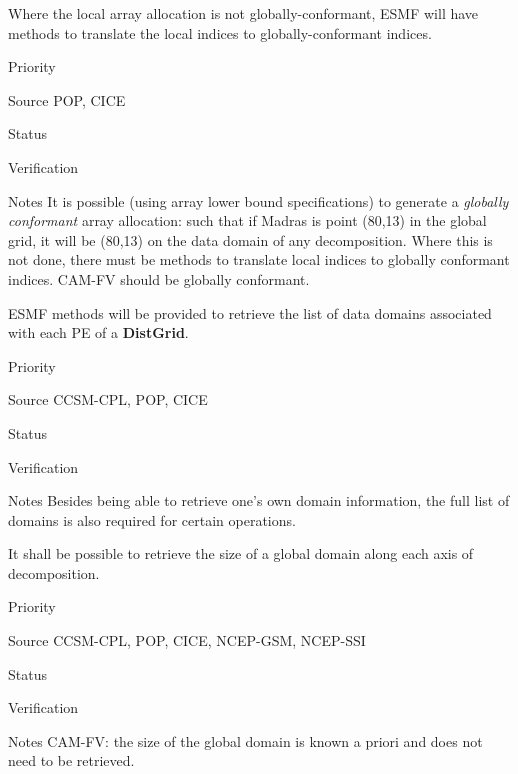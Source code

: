 
Where the local array allocation is not globally-conformant, 
ESMF will have methods to translate the local indices to
globally-conformant indices.

\begin{reqlist}
\item[Priority]
\item[Source] POP, CICE 
\item[Status]
\item[Verification]
\item[Notes] It is possible (using array lower bound specifications)
  to generate a \emph{globally conformant} array allocation: such that
  if Madras is point (80,13) in the global grid, it will be (80,13) on
  the data domain of any decomposition. Where this is not done, there
  must be methods to translate local indices to globally conformant
  indices.  CAM-FV should be globally conformant.
\end{reqlist}


ESMF methods will be provided to retrieve the list of data
domains associated with each PE of a  \textbf{DistGrid}.

\begin{reqlist}
\item[Priority]
\item[Source] CCSM-CPL, POP, CICE
\item[Status]
\item[Verification]
\item[Notes] Besides being able to retrieve one's own domain
  information, the full list of domains is also required for certain
  operations.
\end{reqlist}



It shall be possible to retrieve the size of a global domain
along each axis of decomposition.

\begin{reqlist}
\item[Priority]
\item[Source] CCSM-CPL, POP, CICE, NCEP-GSM, NCEP-SSI
\item[Status]
\item[Verification]
\item[Notes] CAM-FV: the size of the global domain is known
a priori and does not need to be retrieved.
\end{reqlist}


